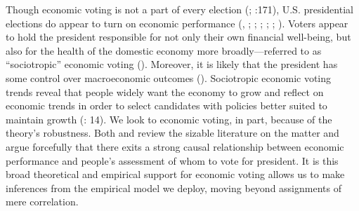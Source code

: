 \documentclass[11pt]{article}
\begin{document}
Though economic voting is not a part of every election (\citet{Stein:1990tt}; \cite{Nadeau:2001tw}:171), U.S. presidential elections do appear to turn on economic performance (\cite{miller1985throwing}, \cite{Fiorina:1978tz}; \cite{Lockerbie:1992js}; \cite{Lanoue:1994bl}; \cite{LewisBeck:2000ww}; \cite{Nadeau:2001tw}; \citet{Markus88}). Voters appear to hold the president responsible for not only their own financial well-being, but also for the health of the domestic economy more broadly---referred to as ``sociotropic'' economic voting  (\citet{Kinder1981}). Moreover, it is likely that the president has some control over macroeconomic outcomes (\cite{blinder2014presidents}). 
Sociotropic economic voting trends reveal that people widely want the economy to grow and reflect on economic trends in order to select candidates with policies better suited to maintain growth (\cite{Duch2008}: 14). 
We look to economic voting, in part, because of the theory's robustness. Both \cite{Duch2008} and \cite{Revisited09} review the sizable literature on the matter and argue forcefully that there exits a strong causal relationship between economic performance and people's assessment of whom to vote for president. It is this broad theoretical and empirical support for economic voting allows us to make inferences from the empirical model we deploy, moving beyond assignments of mere correlation. %
\end{document}
